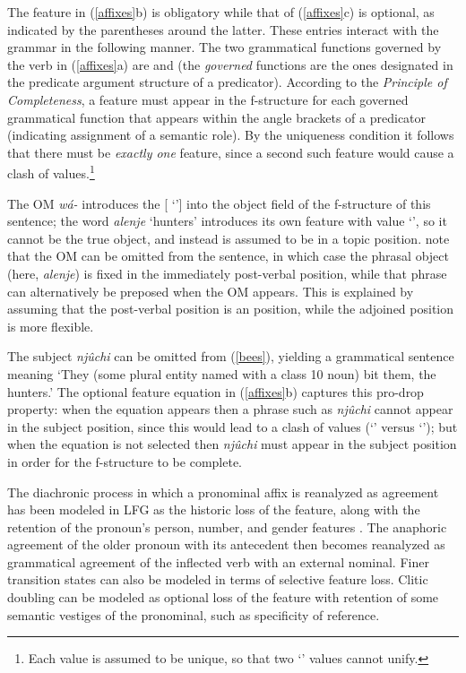 \noindent
The  feature in (\ref{affixes}b) is obligatory while that of (\ref{affixes}c) is optional, as indicated by the parentheses around the latter.  These entries interact with the grammar in the following manner.  The two grammatical functions governed by the verb in (\ref{affixes}a) are  and  (the \textit{governed} functions are the ones designated in the predicate argument structure of a predicator).  According to the \textit{Principle of Completeness}, a  feature must appear in the f-structure for each governed grammatical function that appears within the angle brackets of a predicator (indicating assignment of a semantic role).  By the uniqueness condition it follows that there must be \textit{exactly one}  feature, since a second such feature would cause a clash of values.\footnote{Each  value is assumed to be unique, so that two `' values cannot unify.}  

The OM {\it w\'{a}-} introduces the [ `'] into the object field of the f-structure of this sentence; the word \textit{alenje} `hunters' introduces its own  feature with value `', so it cannot be the true object, and instead is assumed to be in a topic position.  \citet{bresnan+mchombo:1987} note that the OM can be omitted from the sentence, in which case the phrasal object (here, \textit{alenje}) is fixed in the immediately post-verbal position, while that phrase can alternatively be preposed when the OM appears.  This is explained by assuming that the post-verbal position is an  position, while the adjoined  position is more flexible.  

The subject \textit{nj\^{u}chi} can be omitted from (\ref{bees}), yielding a grammatical sentence meaning `They (some plural entity named with a class 10 noun) bit them, the hunters.'  The optional  feature equation in (\ref{affixes}b) captures this pro-drop property: when the equation appears then a phrase such as \textit{nj\^{u}chi} cannot appear in the subject position, since this would lead to a clash of  values 
(`' versus `'); but when the equation is not selected then  \textit{nj\^{u}chi} must appear in the subject position in order for the f-structure to be complete.  

The diachronic process in which a pronominal affix is reanalyzed as agreement has been modeled in LFG as the historic loss of the  feature, along with the retention of the pronoun's person, number, and gender features \citep{coppock+wechsler:2010}.  The anaphoric agreement of the older pronoun with its antecedent then becomes reanalyzed as grammatical agreement of the inflected verb with an external nominal.  Finer transition states can also be modeled in terms of selective feature loss.  Clitic doubling can be modeled as optional loss of the  feature with retention of some semantic vestiges of the pronominal, such as specificity of reference.

